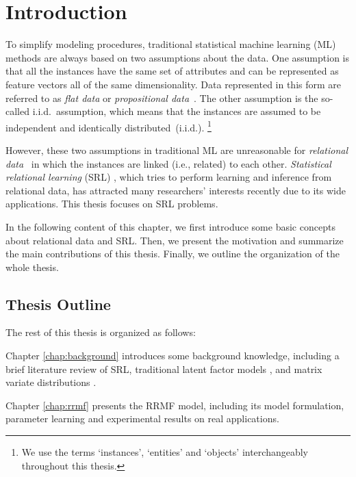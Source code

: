 
\chapter{Introduction}

To simplify modeling procedures, traditional statistical machine learning (ML) methods are always based on two assumptions about the data. One assumption is that all the instances have the same set of attributes and can be represented as feature vectors all of the same dimensionality. Data represented in this form are referred to as
\emph{flat data} or \emph{propositional data}~\cite{book/srl07}. The other assumption is the
so-called i.i.d.\ assumption, which means that the instances are
assumed to be independent and identically distributed~(i.i.d.). \footnote{We use the terms `instances', `entities' and `objects' interchangeably throughout this thesis.}

However, these two assumptions in traditional ML are unreasonable for \emph{relational data}~\cite{book/srl07} in which the instances are linked (i.e., related) to each other. \emph{Statistical relational learning} (SRL) \cite{book/srl07}, which tries to perform learning and inference from relational data, has attracted many researchers' interests recently due to its wide applications. This thesis focuses on SRL problems.

In the following content of this chapter, we first introduce some basic concepts about relational data and SRL. Then, we present the motivation and summarize the main contributions of this thesis. Finally, we outline the organization of the whole thesis.





\section{Thesis Outline}

The rest of this thesis is organized as follows:

Chapter \ref{chap:background} introduces some background knowledge, including a brief literature review of SRL, traditional latent factor models \cite{book/lvmfa}, and matrix variate distributions \cite{book/matrixdistribution}.

Chapter \ref{chap:rrmf} presents the RRMF model, including its model formulation, parameter learning and experimental results on real applications.

